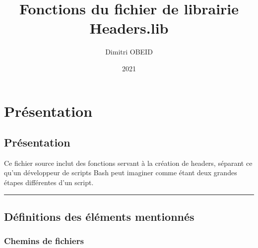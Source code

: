 \documentclass[a4paper,10pt]{article}
\title{\color{sec1}Fonctions du fichier de librairie \color{path}Headers.lib}\color{text}
\author{Dimitri OBEID}
\date{2021}
\begin{document}
\maketitle
\newpage

\hypertarget{contents}{}
\tableofcontents
\newpage

\color{sec1}
\section{Présentation}\color{text}

\color{sec2}
\subsection{Présentation}\color{text}

\begin{justify}
    Ce fichier source inclut des fonctions servant à la création de headers, séparant ce qu'un développeur de scripts Bash peut imaginer comme étant deux grandes étapes différentes d'un script.
\end{justify}




\color{sec2}\par\noindent\rule{\textwidth}{0.4pt}\color{text}

\color{sec2}
\subsection{Définitions des éléments mentionnés}\color{text}

\color{sec3}
\subsubsection{Chemins de fichiers}\color{text}
\end{document}
